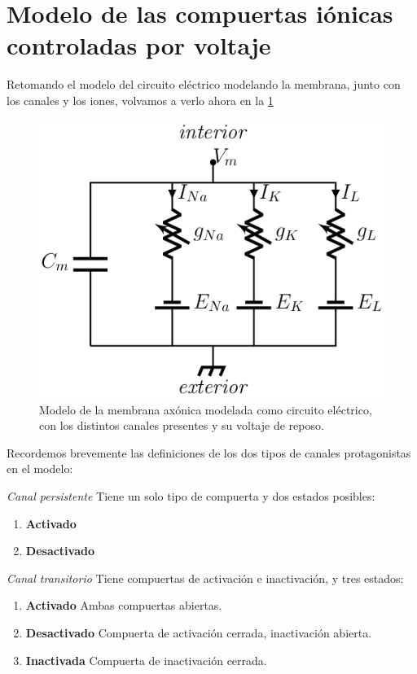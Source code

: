 \section{Modelo de las compuertas iónicas controladas por voltaje}

Retomando el modelo del circuito eléctrico modelando la membrana, junto con los canales y los iones, volvamos a verlo ahora en la \ref{fig:circuito1}

\begin{figure}[H]
 \centering
 \includegraphics[scale=0.5]{../Figuras/circuito.png}
 \caption{Modelo de la membrana axónica modelada como circuito eléctrico, con los distintos canales presentes y su voltaje de reposo.}
 \label{fig:circuito1}
\end{figure}

Recordemos brevemente las definiciones de los dos tipos de canales protagonistas en el modelo:

\begin{definition}
 \emph{Canal persistente} Tiene un solo tipo de compuerta y dos estados posibles:
 \begin{enumerate}
  \item \textbf{Activado}
  \item \textbf{Desactivado}
 \end{enumerate}

\end{definition}

\begin{definition}
 \emph{Canal transitorio} Tiene compuertas de activación e inactivación, y tres estados:
 \begin{enumerate}
  \item \textbf{Activado} Ambas compuertas abiertas.
  \item \textbf{Desactivado} Compuerta de activación cerrada, inactivación abierta.
  \item \textbf{Inactivada} Compuerta de inactivación cerrada.
 \end{enumerate}

\end{definition}


